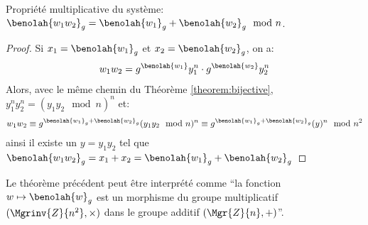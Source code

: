 	\begin{property}{Propriété multiplicative du système: $\benolah{w_1w_2}_g = \benolah{w_1}_g+\benolah{w_2}_g\mod{n}$.}
		\label{prop:mult}
		\begin{proof}
			Si $x_1 = \benolah{w_1}_g$ et  $x_2 = \benolah{w_2}_g$, on a:
			\begin{align*}
				w_1w_2 = g^{\benolah{w_1}}y_1^n \cdot g^{\benolah{w_2}}y_2^n 
			\end{align*}
			Alors, avec le même chemin du Théorème \ref{theorem:bijective}, $y_1^ny_2^n =(y_1y_2\mod{n})^n$ et:
			\begin{align*}
				w_1w_2 \equiv g^{\benolah{w_1}_g+\benolah{w_2}_g}(y_1y_2\mod{n})^n \equiv g^{\benolah{w_1}_g+\benolah{w_2}_g}(y)^n \mod{n^2}
			\end{align*}
			ainsi il existe un $y = y_1y_2$ tel que $\benolah{w_1w_2}_g = x_1+x_2 = \benolah{w_1}_g + \benolah{w_2}_g$
		\end{proof}
	\end{property}

	\begin{remark}
		Le théorème précédent peut être interprété comme ``la fonction $w \mapsto \benolah{w}_g$ est 
		un morphisme du groupe multiplicatif $(\Mgrinv{Z}{n^2},\times)$ dans le groupe additif $(\Mgr{Z}{n},+)$''. 
	\end{remark}
	
